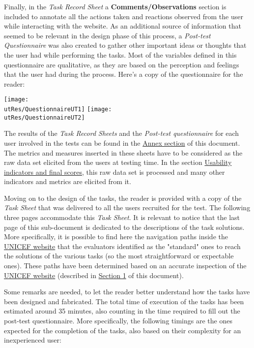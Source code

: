 Finally, in the \textit{Task Record Sheet} a \textbf{Comments/Observations} section is included to annotate all the actions taken and reactions observed from the user while interacting with the website.
As an additional source of information that seemed to be relevant in the design phase of this process, a \textit{Post-test Questionnaire} was also created to gather other important ideas or thoughts that the user had while performing the tasks. Most of the variables defined in this questionnaire are qualitative, as they are based on the perception and feelings that the user had during the process.
Here's a copy of the questionnaire for the reader:

\begin{center}
	\texttt{[image: \\utRes/QuestionnaireUT1]}
	\texttt{[image: \\utRes/QuestionnaireUT2]}
\end{center}

The results of the \textit{Task Record Sheets} and the \textit{Post-test questionnaire} for each user involved in the tests can be found in the \hyperref[sec:annex]{Annex section} of this document.\\
The metrics and measures inserted in these sheets have to be considered as the raw data set elicited from the users at testing time. In the section \hyperref[subsec:resultsUT]{Usability indicators and final scores}, this raw data set is processed and many other indicators and metrics are elicited from it.
 
 
 
Moving on to the design of the tasks, the reader is provided with a copy of the \textit{Task Sheet} that was delivered to all the users recruited for the test. The following three pages accommodate this \textit{Task Sheet}. It is relevant to notice that the last page of this sub-document is dedicated to the descriptions of the task solutions. More specifically, it is possible to find here the navigation paths inside the \href{https://www.unicef.org/}{UNICEF website} that the evaluators identified as the "standard" ones to reach the solutions of the various tasks (so the most straightforward or expectable ones). These paths have been determined based on an accurate inspection of the \href{https://www.unicef.org/}{UNICEF website} (described in \hyperref[sec:inspection]{Section 1} of this document). 


	
Some remarks are needed, to let the reader better understand how the tasks have been designed and fabricated. 
The total time of execution of the tasks has been estimated around 35 minutes, also counting in the time required to fill out the post-test questionnaire. More specifically, the following timings are the ones expected for the completion of the tasks, also based on their complexity for an inexperienced user:

